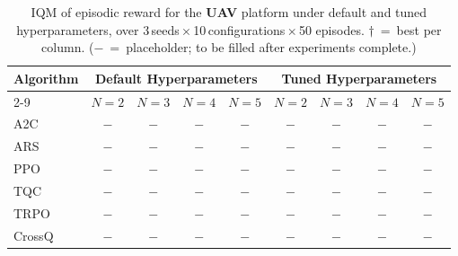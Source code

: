 \documentclass{article}
\begin{document}
\begin{table}[tbp]
\centering
\footnotesize
\caption{\small IQM of episodic reward for the \textbf{UAV} platform under default and tuned hyperparameters, over 3\,seeds\,$\times$\,10\,configurations\,$\times$\,50 episodes. $\dagger$~=~best per column. ($-$~=~placeholder; to be filled after experiments complete.)}
\label{tab:uav_main}
\begin{tabular}{l|cccc|cccc}
    \toprule
    \multirow{2}{*}{\textbf{Algorithm}}
        & \multicolumn{4}{c|}{\textbf{Default Hyperparameters}}
        & \multicolumn{4}{c}{\textbf{Tuned Hyperparameters}} \\
    \cmidrule(lr){2-9}
           & $N=2$ & $N=3$ & $N=4$ & $N=5$
           & $N=2$ & $N=3$ & $N=4$ & $N=5$ \\
    \midrule
    A2C    & $-$ & $-$ & $-$ & $-$ & $-$ & $-$ & $-$ & $-$ \\
    ARS    & $-$ & $-$ & $-$ & $-$ & $-$ & $-$ & $-$ & $-$ \\
    PPO    & $-$ & $-$ & $-$ & $-$ & $-$ & $-$ & $-$ & $-$ \\
    TQC    & $-$ & $-$ & $-$ & $-$ & $-$ & $-$ & $-$ & $-$ \\
    TRPO   & $-$ & $-$ & $-$ & $-$ & $-$ & $-$ & $-$ & $-$ \\
    CrossQ & $-$ & $-$ & $-$ & $-$ & $-$ & $-$ & $-$ & $-$ \\
    \bottomrule
\end{tabular}
\vspace{-6pt}
\end{table}
\end{document}
